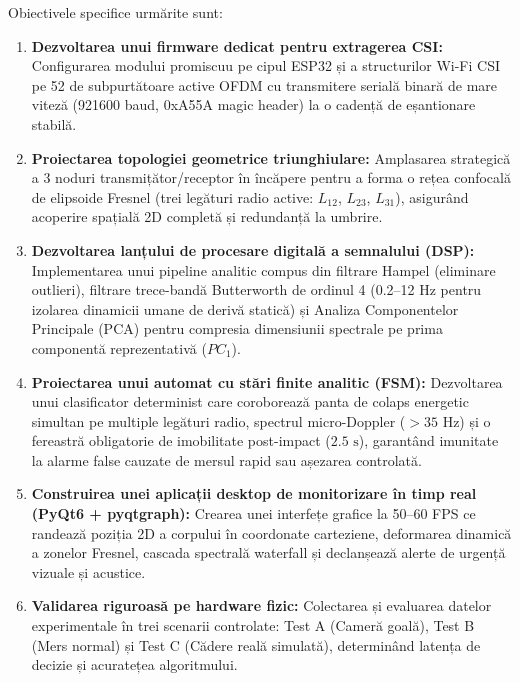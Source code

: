 Obiectivele specifice urmărite sunt:
\begin{enumerate}
    \item \textbf{Dezvoltarea unui firmware dedicat pentru extragerea CSI:} Configurarea modului promiscuu pe cipul ESP32 și a structurilor Wi-Fi CSI pe 52 de subpurtătoare active OFDM cu transmitere serială binară de mare viteză (921600 baud, 0xA55A magic header) la o cadență de eșantionare stabilă.
    \item \textbf{Proiectarea topologiei geometrice triunghiulare:} Amplasarea strategică a 3 noduri transmițător/receptor în încăpere pentru a forma o rețea confocală de elipsoide Fresnel (trei legături radio active: $L_{12}$, $L_{23}$, $L_{31}$), asigurând acoperire spațială 2D completă și redundanță la umbrire.
    \item \textbf{Dezvoltarea lanțului de procesare digitală a semnalului (DSP):} Implementarea unui pipeline analitic compus din filtrare Hampel (eliminare outlieri), filtrare trece-bandă Butterworth de ordinul 4 (0.2--12 Hz pentru izolarea dinamicii umane de derivă statică) și Analiza Componentelor Principale (PCA) pentru compresia dimensiunii spectrale pe prima componentă reprezentativă ($PC_1$).
    \item \textbf{Proiectarea unui automat cu stări finite analitic (FSM):} Dezvoltarea unui clasificator determinist care coroborează panta de colaps energetic simultan pe multiple legături radio, spectrul micro-Doppler ($>35\text{ Hz}$) și o fereastră obligatorie de imobilitate post-impact ($2.5\text{ s}$), garantând imunitate la alarme false cauzate de mersul rapid sau așezarea controlată.
    \item \textbf{Construirea unei aplicații desktop de monitorizare în timp real (PyQt6 + pyqtgraph):} Crearea unei interfețe grafice la 50--60 FPS ce randează poziția 2D a corpului în coordonate carteziene, deformarea dinamică a zonelor Fresnel, cascada spectrală waterfall și declanșează alerte de urgență vizuale și acustice.
    \item \textbf{Validarea riguroasă pe hardware fizic:} Colectarea și evaluarea datelor experimentale în trei scenarii controlate: Test A (Cameră goală), Test B (Mers normal) și Test C (Cădere reală simulată), determinând latența de decizie și acuratețea algoritmului.
\end{enumerate}

